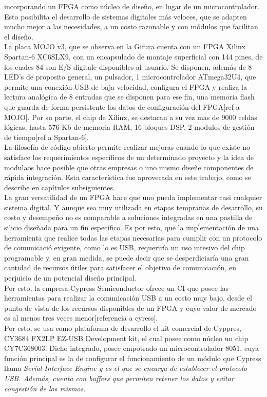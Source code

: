 incorporando un FPGA como núcleo de diseño, en lugar de un microcontrolador. Esto posibilita el desarrollo de sistemas digitales más veloces, que se adapten mucho mejor a las necesidades, a un 
costo razonable y con módulos que facilitan el diseño.\\
	La placa MOJO v3, que se observa en la Gifura %
cuenta con un FPGA Xilinx Spartan-6 XC6SLX9, con un encapsulado de montaje superficial con 144 pines, de los cuales 84 son E/S digitale disponibles al usuario. Se disponen, 
además de 8 LED's de proposito general, un pulsador, 1 microcontrolador ATmega32U4, que permite una conexión USB de baja velocidad, configura el FPGA y realiza la lectura analógica de 8 entradas que se 
disponen para ese fin, una memoria flash que guarda de forma persistente los datos de configuración del FPGA[ref a MOJO]. Por su parte, el chip de Xilinx, se destacan a su vez mas de 9000 celdas 
lógicas, hasta 576 Kb de memoria RAM, 16 bloques DSP, 2 modulos de gestión de tiempo[ref a Spartan-6].\\
	La filosofía de código abierto permite realizar mejoras cuando lo que existe no satisface los requerimientos específicos de un determinado proyecto y la idea de modulaos hace posible que otras 
empresas o uno mismo diseñe componentes de rápida integración. Esta característica fue aprovecada en este trabajo, como se describe en capítulos subsiguientes.\\
 

	La gran versatilidad de un FPGA hace que uno pueda implementar casi cualquier sistema digital. Y aunque sea muy utilizada en etapas tempranas de desarrollo, su costo y desempeño no es comparable
a soluciones integradas en una pastilla de silicio diseñada para un fin específico. Es por esto, que la impĺementación de una herramienta que realice todas las etapas necesarias para cumplir con un
protocolo de comunicació exigente, como lo es USB, requeriría un uso intesivo del chip programable y, en gran medida, se puede decir que se desperdiciaría una gran cantidad de recursos útiles para
satisfacer el objetivo de comunicación, en perjuicio de un potencial diseño principal.\\
	Por esto, la empresa Cypress Semiconductor ofrece un CI que posee las herramientas para realizar la comunicación USB a un costo muy bajo, desde el punto de vista de los recursos disponibles de 
un FPGA y cuyo valor de mercado es al menos tres veces menor[referencia a cyress].\\
	Por esto, se usa como plataforma de desarrollo el kit comercial de Cyppres, CY3684 FX2LP EZ-USB Development kit, el cual posee como núcleo un chip CY7C368003. Dicho integrado, posee empotrado un
microcontrolador 8051, cuya función principal es la de configurar el funcionamiento de un módulo que Cypress llama \it{Serial Interface Engine} y es el que se encarga de establecer el
protocolo USB. Además, cuenta con buffers que permiten retener los datos y evitar congestión de los mismos.\\

	
